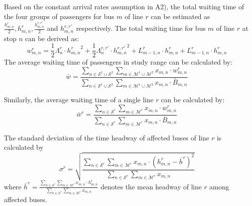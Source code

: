 \documentclass[smallextended]{svjour3}       %
\begin{document}
\begin{Abstract}
Based on the constant arrival rates assumption in A2), 
the total waiting time of the four groups of passengers for bus $m$ of line $r$ can be estimated 
as $\frac{h_{m,n}^{r}}{2},h_{m,n}^{r},\frac{h_{m,n}^{r,r'}}{2}$ and $h_{m,n}^{r,r'}$ respectively. 
The total waiting time for bus $m$ of line $r$ at stop $n$ can be derived as: 
\begin{equation}
    w_{m,n}^{r} = \frac{1}{2}\Lambda_{n}^{r}\cdot {h_{m,n}^{r}}^{2} + \frac{1}{2}\Lambda_{n}^{r,r'}\cdot {h_{m,n}^{r,r'}}^{2}
    + L_{m-1,n}^{r} \cdot h_{m,n}^{r} + L_{m-1,n}^{r} \cdot h_{m,n}^{r}
\end{equation}
The average waiting time of passengers in study range can be calculated by: 
\begin{equation}
    \bar{w} = \frac{\sum\limits_{n\in \mathcal{S}^{1}\cup\mathcal{S}^{2}}\sum\limits_{m\in \mathcal{M}^{1}\cup\mathcal{M}^{2}} x_{m,n}\cdot w_{m,n}^{r}}
    {\sum\limits_{n\in \mathcal{S}^{1}\cup \mathcal{S}^{2}} \sum\limits_{m\in \mathcal{M}^{1}\cup \mathcal{M}^{2}}x_{m,n}\cdot \bar{B}_{m,n}}
\end{equation}

Similarly, the average waiting time of a single line $r$ can be calculated by:
\begin{equation}
    \bar{w}^{r} = \frac{\sum\limits_{n\in \mathcal{S}^{r}}\sum\limits_{m\in \mathcal{M}^{r}} x_{m,n}\cdot w_{m,n}^{r}}
    {\sum\limits_{n\in \mathcal{S}^{r}} \sum\limits_{m\in \mathcal{M}^{r}}x_{m,n}\cdot \bar{B}_{m,n}}
\end{equation}

The standard deviation of the time headway of affected buses of line $r$ is calculated by 
\begin{equation}
    \sigma^{r} = \sqrt{\frac{\sum\limits_{n\in \mathcal{S}^{r}}\sum\limits_{m\in \mathcal{M}^{r}} x_{m,n}\cdot \left(h_{m,n}^{r}-\bar{h}^{r}\right)^{2}}
    {\sum\limits_{n\in \mathcal{S}^{r}}\sum\limits_{m\in \mathcal{M}^{r}} x_{m,n}}}
\end{equation}
where $\bar{h}^{r}=\frac{\sum\limits_{n\in \mathcal{S}^{r}}\sum\limits_{m\in \mathcal{M}^{r}} x_{m,n}\cdot h_{m,n}^{r}}
{\sum\limits_{n\in \mathcal{S}^{r}}\sum\limits_{m\in \mathcal{M}^{r}} x_{m,n}}$ 
denotes the mean headway of line $r$ among affected buses.


\end{Abstract}
\end{document}
